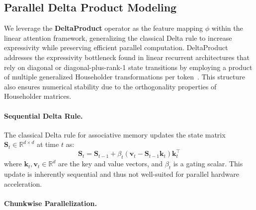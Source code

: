 \documentclass[10pt,a4paper]{article}
\begin{document}

\subsection{Parallel Delta Product Modeling}

We leverage the \textbf{DeltaProduct} operator as the feature mapping $\phi$ within the linear attention framework, generalizing the classical Delta rule to increase expressivity while preserving efficient parallel computation. DeltaProduct addresses the expressivity bottleneck found in linear recurrent architectures that rely on diagonal or diagonal-plus-rank-1 state transitions by employing a product of multiple generalized Householder transformations per token~\cite{siems2025deltaproduct}. This structure also ensures numerical stability due to the orthogonality properties of Householder matrices.

\paragraph{Sequential Delta Rule.}

The classical Delta rule for associative memory updates the state matrix $\mathbf{S}_t \in \mathbb{R}^{d \times d}$ at time $t$ as:
\begin{equation}
    \mathbf{S}_t = \mathbf{S}_{t-1} + \beta_t \left( \mathbf{v}_t - \mathbf{S}_{t-1} \mathbf{k}_t \right) \mathbf{k}_t^\top
    \label{eq:deltarule}
\end{equation}
where $\mathbf{k}_t, \mathbf{v}_t \in \mathbb{R}^d$ are the key and value vectors, and $\beta_t$ is a gating scalar. This update is inherently sequential and thus not well-suited for parallel hardware acceleration.

\paragraph{Chunkwise Parallelization.}
\end{document}
